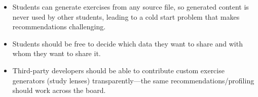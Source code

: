 \begin{itemize}
    \item Students can generate exercises from any source file, so generated content is never used by other students, leading to a cold start problem that makes recommendations challenging.
    \item Students should be free to decide which data they want to share and with whom they want to share it.
    \item Third-party developers should be able to contribute custom exercise generators (study lenses) transparently---the same recommendations/profiling should work across the board. 
\end{itemize}
